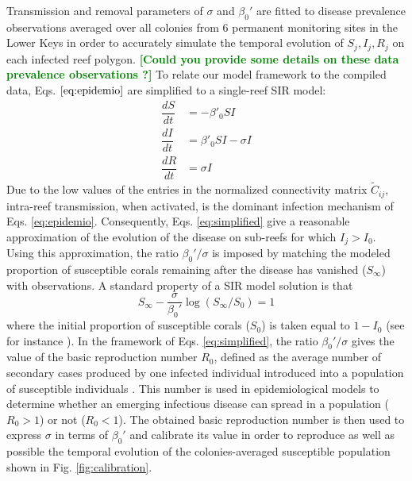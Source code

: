 \documentclass[utf8]{frontiersSCNS}
\newcommand{\erinn}[1]{\textbf{\textcolor{green}{#1}}}
\begin{document}
Transmission and removal parameters of $\sigma$ and $\beta_0'$ are fitted to disease prevalence observations averaged over all colonies from 6 permanent monitoring sites in the Lower Keys in order to accurately simulate the temporal evolution of $S_j,I_j,R_j$ on each infected reef polygon. \erinn{[Could you provide some details on these data prevalence observations ?]}
To relate our model framework to the compiled data, Eqs. $\ref{eq:epidemio}$ are simplified to a single-reef SIR model:
\begin{equation}
    \begin{aligned}
        \dfrac{dS}{dt} &= -\beta'_0SI \\
        \dfrac{dI}{dt} &= \beta'_0SI - \sigma I \\
        \dfrac{dR}{dt} &= \sigma I
    \end{aligned}\label{eq:simplified}
\end{equation}
Due to the low values of the entries in the normalized connectivity matrix $\tilde{C}_{ij}$, intra-reef transmission, when activated, is the dominant infection mechanism of Eqs. \ref{eq:epidemio}. Consequently, Eqs. \ref{eq:simplified} give a reasonable approximation of the evolution of the disease on sub-reefs for which $I_j > I_0$. Using this approximation, the ratio $\beta_0'/\sigma$ is imposed by matching the modeled proportion of susceptible corals remaining after the disease has vanished ($S_\infty$) with observations. A standard property of a SIR model solution is that
\begin{equation}
    S_\infty - \frac{\sigma}{\beta_0'}\log(S_{\infty}/S_0) = 1\label{eq:ratio}
\end{equation}
where the initial proportion of susceptible corals ($S_0$) is taken equal to $1-I_0$ (see for instance \cite{Murray07}). In the framework of Eqs. \ref{eq:simplified}, the ratio $\beta_0'/\sigma$ gives the value of the basic reproduction number $R_0$, defined as the average number of secondary cases produced by one infected individual introduced into a population of susceptible individuals \citep{keeling2007stochastic}. This number is used in epidemiological models to determine whether an emerging infectious disease can spread in a population ($R_0 > 1$) or not ($R_0 < 1$). The obtained basic reproduction number is then used to express $\sigma$ in terms of $\beta_0'$ and calibrate its value in order to reproduce as well as possible the temporal evolution of the colonies-averaged susceptible population shown in Fig. \ref{fig:calibration}.
\end{document}
